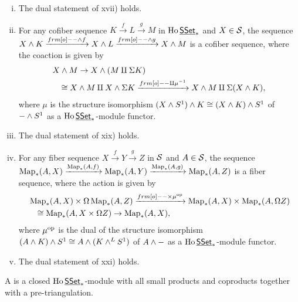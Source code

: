 {\begin{enumerate}[i)]
$$\begin{aligned}
    Z\ov K\amalg\Sigma(X\ov K),\end{aligned}$$
    where $\mu$ is the structure isomorphism $(X\ov K)\ov S^1\cong(X\ov S^1)\ov K$ of $-\ov K$ as a $\Ho\cat{SSet}_*$-module functor.
    \item The dual statement of xvii) holds.
    \item For any cofiber sequence $K\xrightarrow{f}L\xrightarrow{g}M$ in $\Ho\cat{SSet}_*$ and $X\in\mathcal{S}$, the sequence 
    $X\ov K\xrightarrow{\1\ov f}X\ov L\xrightarrow{\1\ov g}X\ov M$ is a cofiber sequence, where the coaction is given by
    $$\begin{aligned}&X\ov M\to X\ov(M\amalg\Sigma K)\\&\hspace{0.8em}\cong X\ov M\amalg X\ov\Sigma K\xrightarrow{\1\amalg\mu^{-1}}
    X\ov M\amalg\Sigma(X\ov K),\end{aligned}$$ where $\mu$ is the structure isomorphism $(X\wedge S^1)\wedge K\cong(X\wedge K)\wedge S^1$ of $-\wedge S^1$ 
    as a $\Ho\cat{SSet}_*$-module functor.
    \item The dual statement of xix) holds.
    \item For any fiber sequence $X\xrightarrow{f}Y\xrightarrow{g}Z$ in $\mathcal{S}$ and $A\in\mathcal{S}$, the sequence
    $\operatorname{Map}_*(A,X)\xrightarrow{\operatorname{Map}_*(A,f)}\operatorname{Map}_*(A,Y)\xrightarrow{\operatorname{Map}_*(A,g)}\operatorname{Map}_*(A,Z)$ is a fiber sequence, where the action is given by
    $$\begin{aligned}&\Map_*(A,X)\times\Omega\Map_*(A,Z)\xrightarrow{\1\times\mu^\op}\Map_*(A,X)\times\Map_*(A,\Omega Z)\\
    &\hspace{0.8em}\cong\Map_*(A,X\times\Omega Z)\to\Map_*(A,X),\end{aligned}$$
    where $\mu^{\mathrm{op}}$ is the dual of the structure isomorphism $(A\wedge K)\wedge S^1\cong A\wedge(K\wedge^LS^1)$ of $A\wedge-$ as a $\Ho\cat{SSet}_*$-module functor.
    \item The dual statement of xxi) holds.
    \end{enumerate}
    A  is a closed $\Ho\cat{SSet}_*$-module with all small products and coproducts together with a pre-triangulation.
}

